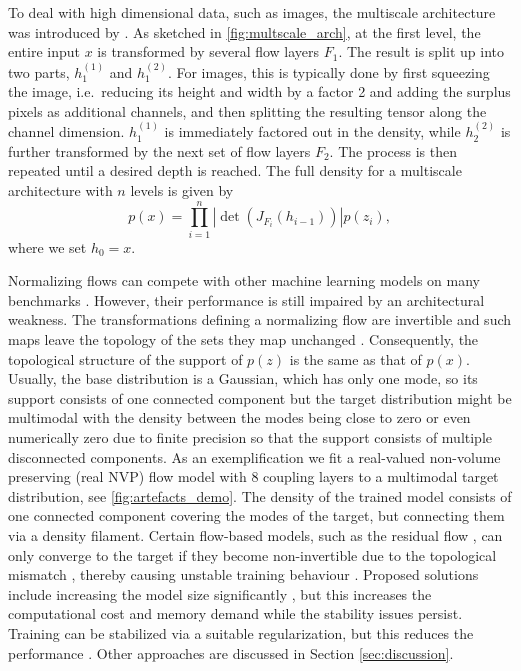 \documentclass[twoside]{article}
\begin{document}
To deal with high dimensional data, such as images, the multiscale architecture was introduced by \cite{Dinh2017}. As sketched in \autoref{fig:multscale_arch}, at the first level, the entire input $x$ is transformed by several flow layers $F_1$. The result is split up into two parts, $h_1^{(1)}$ and $h_1^{(2)}$. For images, this is typically done by first squeezing the image, i.e.\ reducing its height and width by a factor 2 and adding the surplus pixels as additional channels, and then splitting the resulting tensor along the channel dimension. $h_1^{(1)}$ is immediately factored out in the density, while $h_2^{(2)}$ is further transformed by the next set of flow layers $F_2$. The process is then repeated until a desired depth is reached. The full density for a multiscale architecture with $n$ levels is given by
\begin{equation}
	p(x) = \prod_{i=1}^{n} \left| \det\left( J_{F_i}(h_{i-1})\right) \right| p(z_i),
\end{equation}
where we set $h_0 = x$.

Normalizing flows can compete with other machine learning models on many benchmarks \citep{Papamakarios2021}. However, their performance is still impaired by an architectural weakness. The transformations defining a normalizing flow are invertible and such maps leave the topology of the sets they map unchanged \citep{Runde2005}. Consequently, the topological structure of the support of $p(z)$ is the same as that of $p(x)$. Usually, the base distribution is a Gaussian, which has only one mode, so its support consists of one connected component but the target distribution might be multimodal with the density between the modes being close to zero or even numerically zero due to finite precision so that the support consists of multiple disconnected components. As an exemplification we fit a real-valued non-volume preserving (real NVP) flow model with 8 coupling layers to a multimodal target distribution, see \autoref{fig:artefacts_demo}. The density of the trained model consists of one connected component covering the modes of the target, but connecting them via a density filament. Certain flow-based models, such as the residual flow \citep{Behrmann2019,Chen2019a}, can only converge to the target if they become non-invertible due to the topological mismatch \citep{Cornish2020}, thereby causing unstable training behaviour \citep{Behrmann2021}. Proposed solutions include increasing the model size significantly \citep{Chen2019a}, but this increases the computational cost and memory demand while the stability issues persist. Training can be stabilized via a suitable regularization, but this reduces the performance \citep{Behrmann2021}. Other approaches are discussed in Section \ref{sec:discussion}.
\end{document}
